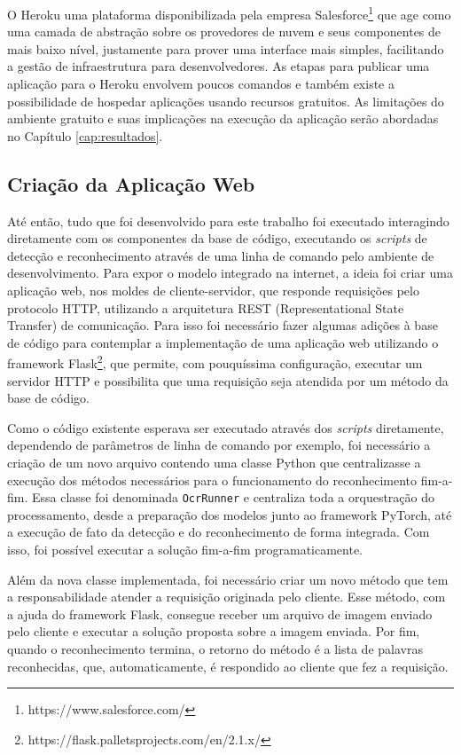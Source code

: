 O Heroku uma plataforma disponibilizada pela empresa Salesforce\footnote{https://www.salesforce.com/} que age como uma camada de abstração sobre os provedores de nuvem e seus componentes de mais baixo nível, justamente para prover uma interface mais simples, facilitando a gestão de infraestrutura para desenvolvedores. As etapas para publicar uma aplicação para o Heroku envolvem poucos comandos e também existe a possibilidade de hospedar aplicações usando recursos gratuitos. As limitações do ambiente gratuito e suas implicações na execução da aplicação serão abordadas no Capítulo \ref{cap:resultados}.

\subsection{Criação da Aplicação Web}\label{sec:methodology_web_app}
Até então, tudo que foi desenvolvido para este trabalho foi executado interagindo diretamente com os componentes da base de código, executando os \textit{scripts} de detecção e reconhecimento através de uma linha de comando pelo ambiente de desenvolvimento. Para expor o modelo integrado na internet, a ideia foi criar uma aplicação web, nos moldes de cliente-servidor, que responde requisições pelo protocolo HTTP, utilizando a arquitetura REST (Representational State Transfer) de comunicação. Para isso foi necessário fazer algumas adições à base de código para contemplar a implementação de uma aplicação web utilizando o framework Flask\footnote{https://flask.palletsprojects.com/en/2.1.x/}, que permite, com pouquíssima configuração, executar um servidor HTTP e possibilita que uma requisição seja atendida por um método da base de código.

Como o código existente esperava ser executado através dos \textit{scripts} diretamente, dependendo de parâmetros de linha de comando por exemplo, foi necessário a criação de um novo arquivo contendo uma classe Python que centralizasse a execução dos métodos necessários para o funcionamento do reconhecimento fim-a-fim. Essa classe foi denominada \texttt{OcrRunner} e centraliza toda a orquestração do processamento, desde a preparação dos modelos junto ao framework PyTorch, até a execução de fato da detecção e do reconhecimento de forma integrada. Com isso, foi possível executar a solução fim-a-fim programaticamente.

Além da nova classe implementada, foi necessário criar um novo método que tem a responsabilidade atender a requisição originada pelo cliente. Esse método, com a ajuda do framework Flask, consegue receber um arquivo de imagem enviado pelo cliente e executar a solução proposta sobre a imagem enviada. Por fim, quando o reconhecimento termina, o retorno do método é a lista de palavras reconhecidas, que, automaticamente, é respondido ao cliente que fez a requisição.

